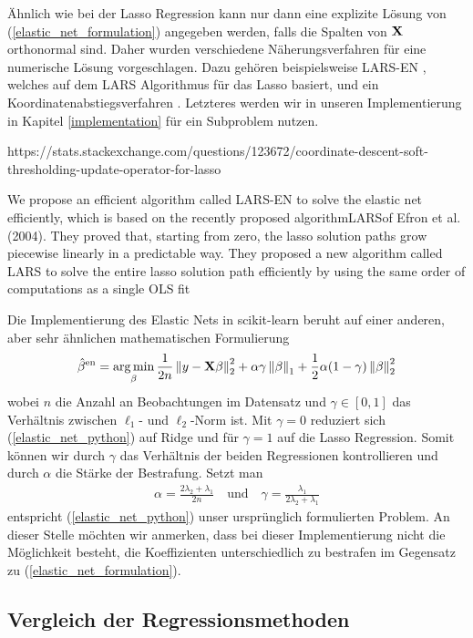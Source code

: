 Ähnlich wie bei der Lasso Regression kann nur dann eine explizite Lösung von (\ref{elastic_net_formulation}) angegeben werden, falls die Spalten von $\mathbf{X}$ orthonormal sind. Daher wurden verschiedene Näherungsverfahren für eine numerische Lösung vorgeschlagen. Dazu gehören beispielsweise LARS-EN \cite{zou_elasticnet}, welches auf dem LARS Algorithmus für das Lasso basiert, und ein Koordinatenabstiegsverfahren \cite{friedman}. Letzteres werden wir in unseren Implementierung in Kapitel \ref{implementation} für ein Subproblem nutzen.

https://stats.stackexchange.com/questions/123672/coordinate-descent-soft-thresholding-update-operator-for-lasso

We propose an efficient algorithm called LARS-EN to solve the elastic net efficiently, which is
based on the recently proposed algorithmLARSof Efron et al. (2004). They proved that, starting
from zero, the lasso solution paths grow piecewise linearly in a predictable way. They proposed
a new algorithm called LARS to solve the entire lasso solution path efficiently by using the same
order of computations as a single OLS fit

Die Implementierung des Elastic Nets in scikit-learn \cite{scikit_learn} beruht auf einer anderen, aber sehr ähnlichen mathematischen Formulierung
\begin{align}
\label{elastic_net_python}
\hat{\beta}^{\text{en}} = \operatorname*{arg\,min}_{\beta} \frac{1}{2n} \left\lVert y - \mathbf{X} \beta \right\rVert_2^2 + \alpha \gamma \left\lVert \beta \right\rVert_{1} + \frac{1}{2}\alpha (1-\gamma) \left\lVert \beta \right\rVert_{2}^2
\end{align}
wobei $n$ die Anzahl an Beobachtungen im Datensatz und $\gamma \in [0,1]$ das Verhältnis zwischen $\ell_1$- und $\ell_2$-Norm ist. Mit $\gamma = 0$ reduziert sich (\ref{elastic_net_python}) auf Ridge und für $\gamma = 1$ auf die Lasso Regression. Somit können wir durch $\gamma$ das Verhältnis der beiden Regressionen kontrollieren und durch $\alpha$ die Stärke der Bestrafung. Setzt man 
\begin{align}
 \alpha = \frac{2\lambda_2 + \lambda_1}{2n} \quad \text{und} \quad \gamma = \frac{\lambda_1}{2\lambda_2 + \lambda_1}
\end{align}
entspricht (\ref{elastic_net_python}) unser ursprünglich formulierten Problem. An dieser Stelle möchten wir anmerken, dass bei dieser Implementierung nicht die Möglichkeit besteht, die Koeffizienten unterschiedlich zu bestrafen im Gegensatz zu (\ref{elastic_net_formulation}).

\subsection{Vergleich der Regressionsmethoden}
\label{comparison_linear_models}

